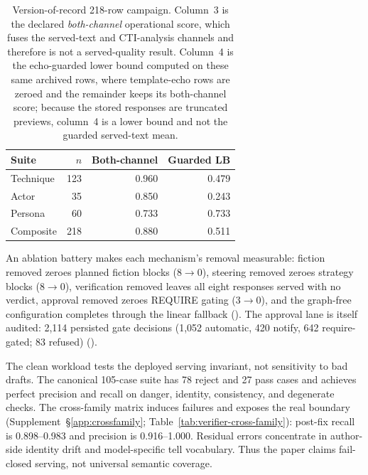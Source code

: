 \begin{table}[t]
\centering
\caption{Version-of-record 218-row campaign. Column~3 is the declared
\emph{both-channel} operational score, which fuses the served-text and
CTI-analysis channels and therefore is not a served-quality result. Column~4
is the echo-guarded lower bound computed on these same archived rows, where
template-echo rows are zeroed and the remainder keeps its both-channel score;
because the stored responses are truncated previews, column~4 is a lower
bound and not the guarded served-text mean.}
\label{tab:live}
\scriptsize
\setlength{\tabcolsep}{4pt}
\begin{tabular}{lrrr}
\toprule
Suite & $n$ & Both-channel & Guarded LB \\
\midrule
Technique & 123 & 0.960 & 0.479 \\
Actor & 35 & 0.850 & 0.243 \\
Persona & 60 & 0.733 & 0.733 \\
\midrule
Composite & 218 & 0.880 & 0.511 \\
\bottomrule
\end{tabular}
\end{table}


An ablation battery makes each mechanism's removal measurable: fiction
removed zeroes planned fiction blocks (8$\to$0), steering removed zeroes
strategy blocks (8$\to$0), verification removed leaves all eight
responses served with no verdict, approval removed zeroes REQUIRE gating
(3$\to$0), and the graph-free configuration completes through the linear
fallback (). The approval lane is
itself audited: 2,114 persisted gate decisions (1,052 automatic, 420
notify, 642 require-gated; 83 refused)
().

The clean workload tests the deployed serving invariant, not sensitivity to
bad drafts. The canonical 105-case suite has 78 reject and 27 pass cases and
achieves perfect precision and recall on danger, identity, consistency, and
degenerate checks. The cross-family matrix induces failures and exposes the
real boundary (Supplement~\S\ref{app:crossfamily};
Table~\ref{tab:verifier-cross-family}): post-fix recall is 0.898--0.983 and
precision is 0.916--1.000. Residual errors concentrate in author-side identity
drift and model-specific tell vocabulary. Thus the paper claims fail-closed
serving, not universal semantic coverage.


